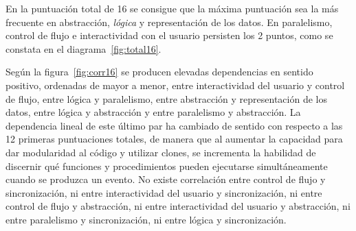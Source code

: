 \documentclass[a4paper, 12pt]{book}
\begin{document}
En la puntuación total de 16 se consigue que la máxima puntuación sea la más frecuente en abstracción, \emph{lógica} y representación de los datos. En paralelismo, control de flujo e interactividad con el usuario persisten los 2 puntos, como se constata en el diagrama~\ref{fig:total16}.

Según la figura~\ref{fig:corr16} se producen elevadas dependencias en sentido positivo, ordenadas de mayor a menor, entre interactividad del usuario y control de flujo, entre lógica y paralelismo, entre abstracción y representación de los datos, entre lógica y abstracción y entre paralelismo y abstracción. La dependencia lineal de este último par ha cambiado de sentido con respecto a las 12 primeras puntuaciones totales, de manera que al aumentar la capacidad para dar modularidad al código y utilizar clones, se incrementa la habilidad de discernir qué funciones y procedimientos pueden ejecutarse simultáneamente cuando se produzca un evento. No existe correlación entre control de flujo y sincronización, ni entre interactividad del usuario y sincronización, ni entre control de flujo y abstracción, ni entre interactividad del usuario y abstracción, ni entre paralelismo y sincronización, ni entre lógica y sincronización. 
\end{document}

